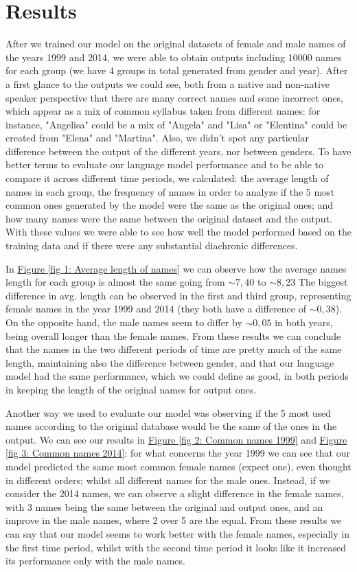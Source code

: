 \section*{Results}
After we trained our model on the original datasets of female and male names of the years 1999 and 2014, we were able to obtain outputs including 10000 names for each group (we have 4 groups in total generated from gender and year). After a first glance to the outputs we could see, both from a native and non-native speaker perspective that there are many correct names and some incorrect ones, which appear as a mix of common syllabus taken from different names: for instance, "Angelisa" could be a mix of "Angela" and "Lisa" or "Elentina" could be created from "Elena" and "Martina". Also, we didn't spot any particular difference between the output of the different years, nor between genders. To have better terms to evaluate our language model performance and to be able to compare it across different time periods, we calculated: the average length of names in each group, the frequency of names in order to analyze if the 5 most common ones generated by the model were the same as the original ones; and how many names were the same between the original dataset and the output. With these values we were able to see how well the model performed based on the training data and if there were any substantial diachronic differences. 

In \href{fig 1: Average length of names}{Figure \ref{fig 1: Average length of names}} we can observe how the average names length for each group is almost the same going from \(\sim 7,40\) to \(\sim 8,23\) The biggest difference in avg. length can be observed in the first and third group, representing female names in the year 1999 and 2014 (they both have a difference of  \(\sim 0,38\)). On the opposite hand, the male names seem to differ by  \(\sim 0,05\) in both years, being overall longer than the female names. From these results we can conclude that the names in the two different periods of time are pretty much of the same length, maintaining also the difference between gender, and that our language model had the same performance, which we could define as good, in both periods in keeping the length of the original names for output ones. 

Another way we used to evaluate our model was observing if the 5 most used names according to the original database would be the same  of the ones in the output. We can see our results in \href{fig 2: Common names 1999}{Figure \ref{fig 2: Common names 1999}} and \href{fig 3: Common names 2014}{Figure \ref{fig 3: Common names 2014}}: for what concerns the year 1999 we can see that our model predicted the same most common female names (expect one), even thought in different orders; whilst all different names for the male ones. Instead, if we consider the 2014 names, we can observe a slight difference in the female names, with 3 names being the same between the original and output ones, and an improve in the male names, where 2 over 5 are the equal. From these results we can say that our model seems to work better with the female names, especially in the first time period, whilst with the second time period it looks like it increased its performance only with the male names. 

